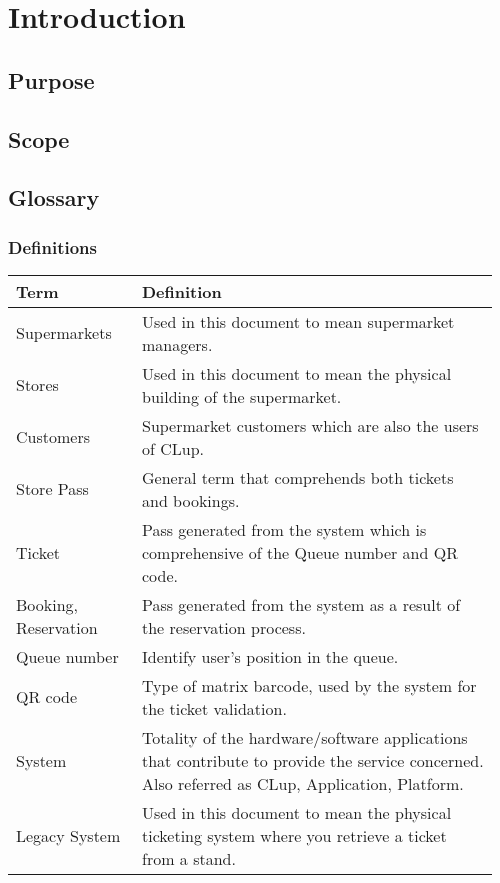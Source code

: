 \chapter{Introduction}

\section{Purpose}

\section{Scope}

\section{Glossary}
\subsection{Definitions}
\begin{center}
	\begin{tabular}{@{}p{0.25\linewidth} p{0.71\linewidth}@{}}
		\toprule
		\textbf{Term} & \textbf{Definition}\\
		\midrule
		Supermarkets & Used in this document to mean supermarket managers.\\
		Stores & Used in this document to mean the physical building of the supermarket.\\
		Customers & Supermarket customers which are also the users of CLup.\\
		Store Pass & General term that comprehends both tickets and bookings.\\
		Ticket & Pass generated from the system which is comprehensive of the Queue number and QR code.\\
		Booking, Reservation & Pass generated from the system as a result of the reservation process.\\
		Queue number & Identify user's position in the queue.\\
		QR code & Type of matrix barcode, used by the system for the ticket validation.\\
		System & Totality of the hardware/software applications that contribute to provide the service concerned. Also referred as CLup, Application, Platform.\\
		Legacy System & Used in this document to mean the physical ticketing system where you retrieve a ticket from a stand.\\
		\bottomrule
	\end{tabular}
\end{center}

